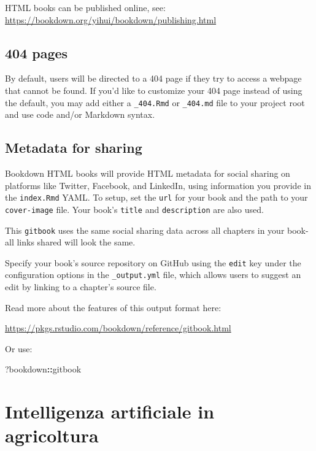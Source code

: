\documentclass[
]{book}
\newenvironment{Shaded}{\begin{snugshade}}{\end{snugshade}}
\newcommand{\NormalTok}[1]{#1}
\newcommand{\SpecialCharTok}[1]{\textcolor[rgb]{0.81,0.36,0.00}{\textbf{#1}}}
\theoremstyle{definition}
\theoremstyle{definition}
\theoremstyle{definition}
\theoremstyle{definition}
\theoremstyle{remark}
\begin{document}
HTML books can be published online, see: \url{https://bookdown.org/yihui/bookdown/publishing.html}

\hypertarget{pages}{%
\section{404 pages}\label{pages}}

By default, users will be directed to a 404 page if they try to access a webpage that cannot be found. If you'd like to customize your 404 page instead of using the default, you may add either a \texttt{\_404.Rmd} or \texttt{\_404.md} file to your project root and use code and/or Markdown syntax.

\hypertarget{metadata-for-sharing}{%
\section{Metadata for sharing}\label{metadata-for-sharing}}

Bookdown HTML books will provide HTML metadata for social sharing on platforms like Twitter, Facebook, and LinkedIn, using information you provide in the \texttt{index.Rmd} YAML. To setup, set the \texttt{url} for your book and the path to your \texttt{cover-image} file. Your book's \texttt{title} and \texttt{description} are also used.

This \texttt{gitbook} uses the same social sharing data across all chapters in your book- all links shared will look the same.

Specify your book's source repository on GitHub using the \texttt{edit} key under the configuration options in the \texttt{\_output.yml} file, which allows users to suggest an edit by linking to a chapter's source file.

Read more about the features of this output format here:

\url{https://pkgs.rstudio.com/bookdown/reference/gitbook.html}

Or use:

\begin{Shaded}
\begin{Highlighting}[]
\NormalTok{?bookdown}\SpecialCharTok{::}\NormalTok{gitbook}
\end{Highlighting}
\end{Shaded}

\hypertarget{intelligenza-artificiale-in-agricoltura}{%
\chapter{Intelligenza artificiale in agricoltura}\label{intelligenza-artificiale-in-agricoltura}}
\end{document}
